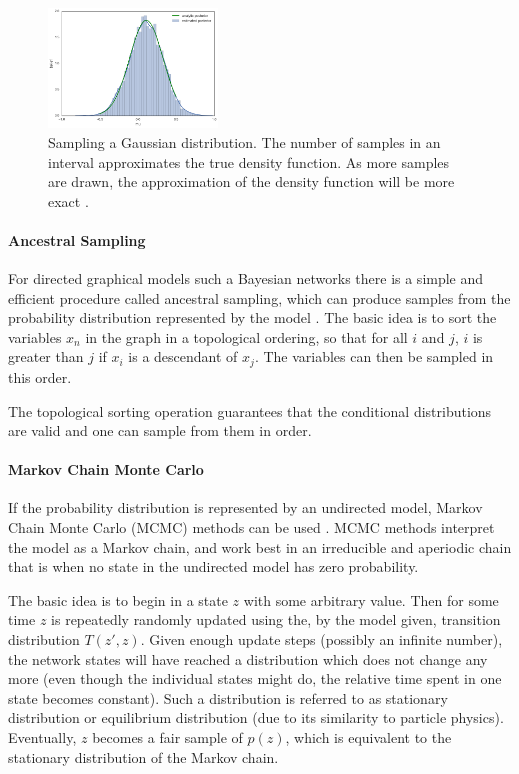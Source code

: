 \begin{figure}
	\centering
    	\includegraphics[width=0.4\textwidth]{imgs/sampling.png} 
    \caption[Sampling a Gaussian distribution.]{Sampling a Gaussian distribution. The number of samples in an interval approximates the true density function. As more samples are drawn, the approximation of the density function will be more exact \cite{sampleFD}.}
	\label{fig:Sampling}
\end{figure}



\paragraph{Ancestral Sampling} For directed graphical models such a Bayesian networks there is a simple and efficient procedure called ancestral sampling, which can produce samples from the probability distribution represented by the model \cite{Goodfellow-et-al-2016-Book}. 
The basic idea is to sort the variables $x_n$ in the graph in a topological ordering, so that for all $i$ and $j$, $i$ is greater than $j$ if $x_i$ is a descendant of $x_j$. The variables can then be sampled in this order.

The topological sorting operation guarantees that the conditional distributions are valid and one can sample from them in order.

\paragraph{Markov Chain Monte Carlo} If the probability distribution is represented by an undirected model, Markov Chain Monte Carlo (MCMC) methods can be used \cite{Goodfellow-et-al-2016-Book}. 
MCMC methods interpret the model as a Markov chain, and work best in an irreducible and aperiodic chain that is when no state in the undirected model has zero probability.

The basic idea is to begin in a state $z$ with some arbitrary value. 
Then for some time $z$ is repeatedly randomly updated using the, by the model given, transition distribution $T(z',z)$. 
Given enough update steps (possibly an infinite number), the network states will have reached a distribution which does not change any more (even though the individual states might do, the relative time spent in one state becomes constant).
Such a distribution is referred to as stationary distribution or equilibrium distribution (due to its similarity to particle physics).
Eventually, $z$ becomes a fair sample of $p(z)$, which is equivalent to the stationary distribution of the Markov chain.

